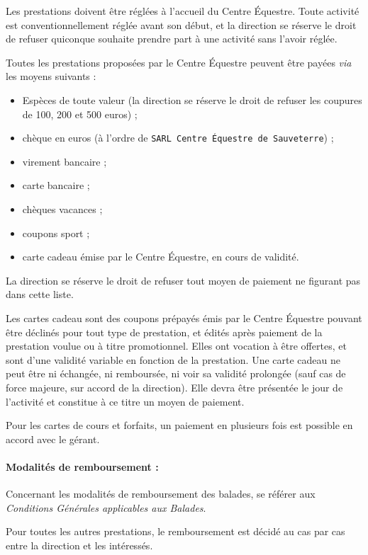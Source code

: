 \documentclass[11pt,a4paper]{article}
\begin{document}
   Les prestations doivent être réglées à l'accueil du Centre Équestre.
   Toute activité est conventionnellement réglée avant son début, et la direction se réserve le droit de refuser quiconque souhaite prendre part à une activité sans l'avoir réglée.

   Toutes les prestations proposées par le Centre Équestre peuvent être payées \textit{via} les moyens suivants :
   \begin{itemize}
      \item Espèces de toute valeur (la direction se réserve le droit de refuser les coupures de 100, 200 et 500 euros) ;
      \item chèque en euros (à l'ordre de \texttt{SARL Centre Équestre de Sauveterre}) ;
      \item virement bancaire ;
      \item carte bancaire ;
      \item chèques vacances ;
      \item coupons sport ;
      \item carte cadeau émise par le Centre Équestre, en cours de validité.
   \end{itemize}

   La direction se réserve le droit de refuser tout moyen de paiement ne figurant pas dans cette liste.

   Les \og cartes cadeau \fg{} sont des coupons prépayés émis par le Centre Équestre pouvant être déclinés pour tout type de prestation, et édités après paiement de la prestation voulue ou à titre promotionnel.
   Elles ont vocation à être offertes, et sont d'une validité variable en fonction de la prestation.
   Une carte cadeau ne peut être ni échangée, ni remboursée, ni voir sa validité prolongée (sauf cas de force majeure, sur accord de la direction).
   Elle devra être présentée le jour de l'activité et constitue à ce titre un moyen de paiement.

   Pour les cartes de cours et forfaits, un paiement en plusieurs fois est possible en accord avec le gérant.

   \paragraph[Modalités de remboursement :  ]{Modalités de remboursement :\\}
   Concernant les modalités de remboursement des balades, se référer aux \textit{Conditions Générales applicables aux Balades}.

   Pour toutes les autres prestations, le remboursement est décidé au cas par cas entre la direction et les intéressés.
\end{document}

